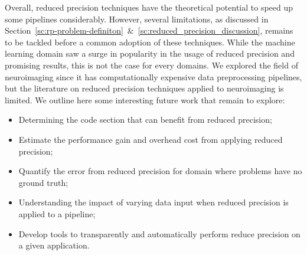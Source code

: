 Overall, reduced precision techniques have the theoretical potential to speed up
some pipelines considerably.
However, several limitations, as discussed in Section~\ref{sc:rp-problem-definiton}~\&~\ref{sc:reduced_precision_discussion},
remains to be tackled before a common adoption of these techniques.
While the machine learning domain saw a surge in popularity in the usage of 
reduced precision and promising results, this is not the case for every domains.
We explored the field of neuroimaging since it has computationally expensive data preprocessing pipelines,
but the literature on reduced precision techniques applied to neuroimaging is limited.
We outline here some interesting future work that remain to explore:
\begin{itemize}
	\item Determining the code section that can benefit from reduced precision;
	\item Estimate the performance gain and overhead cost from applying reduced precision;
	\item Quantify the error from reduced precision for domain where problems have no ground truth;
	\item Understanding the impact of varying data input when reduced precision is applied to a pipeline;
	\item Develop tools to transparently and automatically perform reduce precision on a given application.
\end{itemize}

